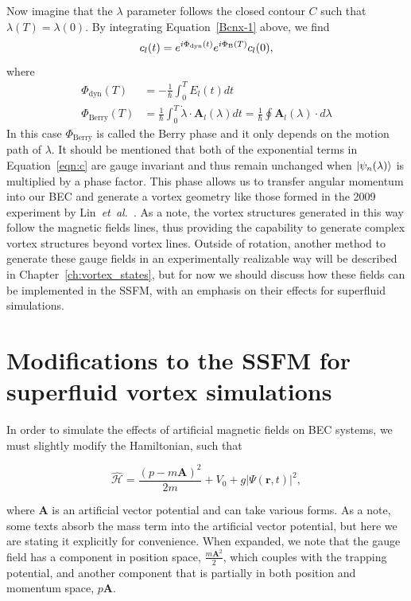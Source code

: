 Now imagine that the $\lambda$ parameter follows the closed contour $C$ such that $\lambda(T) = \lambda(0)$. 
By integrating Equation~\eqref{Bcnx-1} above, we find
\begin{equation}
c_l(t) = e^{i \Phi_{\text{dyn}}(t)}e^{i\Phi_{\text B}(T)}c_l(0),
\label{eqn:c}
\end{equation}
where
\begin{equation}
\begin{split}
\Phi_{\text{dyn}}(T) &= - \frac{1}{\hbar}\int_0^TE_l(t)dt \\
\Phi_{\text{Berry}} (T)&= \frac{1}{\hbar} \int_0 ^T \dot{\lambda} \cdot \mathbf{A}_l(\lambda)dt = \frac{1}{\hbar}\oint\mathbf{A}_l(\lambda) \cdot d\lambda
\end{split}
\end{equation}
In this case $\Phi_{\text{Berry}}$ is called the Berry phase and it only depends on the motion path of $\lambda$. 
It should be mentioned that both of the exponential terms in Equation~\eqref{eqn:c} are gauge invariant and thus remain unchanged when $\ket{\psi_n(\lambda)}$ is multiplied by a phase factor.
This phase allows us to transfer angular momentum into our BEC and generate a vortex geometry like those formed in the 2009 experiment by Lin~\textit{et~al.}~\cite{lin2009}.
As a note, the vortex structures generated in this way follow the magnetic fields lines, thus providing the capability to generate complex vortex structures beyond vortex lines.
Outside of rotation, another method to generate these gauge fields in an experimentally realizable way will be described in Chapter~\ref{ch:vortex_states}, but for now we should discuss how these fields can be implemented in the SSFM, with an emphasis on their effects for superfluid simulations.

\section{Modifications to the SSFM for superfluid vortex simulations}
\label{sec:implementation}

In order to simulate the effects of artificial magnetic fields on BEC systems, we must slightly modify the Hamiltonian, such that

\begin{equation}
\mathcal{\hat H} = \frac{(p-m\mathbf{A})^2}{2m} + V_0 + g|\Psi(\mathbf{r},t)|^2,
\end{equation}

\noindent where $\mathbf{A}$ is an artificial vector potential and can take various forms.
As a note, some texts absorb the mass term into the artificial vector potential, but here we are stating it explicitly for convenience.
When expanded, we note that the gauge field has a component in position space, $\frac{m\mathbf{A}^2}{2}$, which couples with the trapping potential, and another component that is partially in both position and momentum space, $p\mathbf{A}$.


